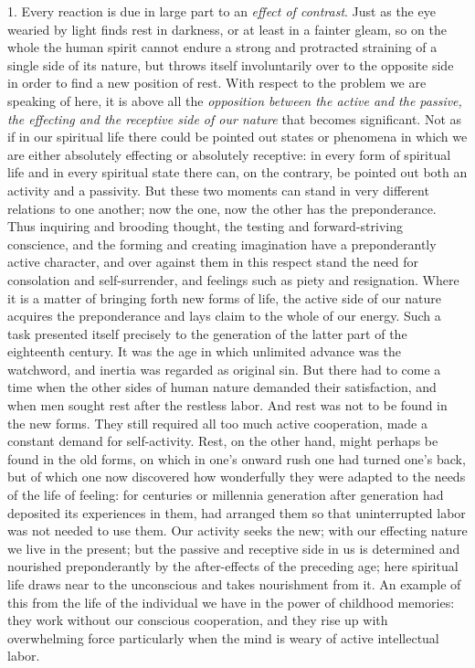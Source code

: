 \documentclass[12pt,a4paper,openany]{book}
\newcommand{\opage}[1]{\marginnote{\footnotesize\textit{[#1]}}}
\begin{document}
1. Every reaction is due in large part to an \emph{effect of contrast}.
Just as the eye wearied by light finds rest in darkness, or at least in a
fainter gleam, so on the whole the human spirit cannot endure a strong and
protracted straining of a single side of its nature, but throws itself
involuntarily over to the opposite side in order to find a new position of
rest. With respect to the problem we are speaking of here, it is above all the
\emph{opposition between the active and the passive, the effecting and the receptive
side of our nature} that becomes significant. Not as if in our spiritual life
there could be pointed out states or phenomena in which we are either
absolutely effecting or absolutely receptive: in every form of spiritual life
and in every spiritual state there can, on the contrary, be pointed out both an
activity and a passivity. But these two moments can stand in very different
relations to one another; now the one, now the other has the preponderance.
Thus inquiring and brooding thought, the testing and forward-striving
conscience, and the forming and creating imagination have a preponderantly
active character, and over against them in this respect stand the need for
consolation and self-surrender, and feelings such as piety and resignation.
Where it is a matter of bringing forth new forms of life, the active side of
our nature acquires the preponderance and lays claim to the whole of our
energy.
\opage{204}Such a task presented itself precisely to the generation of the latter part
of the eighteenth century. It was the age in which unlimited advance was the
watchword, and inertia was regarded as original sin. But there had to come a
time when the other sides of human nature demanded their satisfaction, and
when men sought rest after the restless labor. And rest was not to be found in
the new forms. They still required all too much active cooperation, made a
constant demand for self-activity. Rest, on the other hand, might perhaps be
found in the old forms, on which in one's onward rush one had turned one's
back, but of which one now discovered how wonderfully they were adapted to the
needs of the life of feeling: for centuries or millennia generation after
generation had deposited its experiences in them, had arranged them so that
uninterrupted labor was not needed to use them. Our activity seeks the new;
with our effecting nature we live in the present; but the passive and
receptive side in us is determined and nourished preponderantly by the
after-effects of the preceding age; here spiritual life draws near to the
unconscious and takes nourishment from it. An example of this from the life of
the individual we have in the power of childhood memories: they work without
our conscious cooperation, and they rise up with overwhelming force
particularly when the mind is weary of active intellectual labor.
\end{document}
